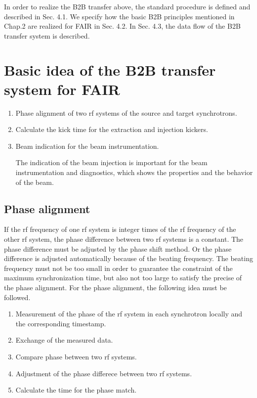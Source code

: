 

In order to realize the B2B transfer above, the standard procedure is defined and described in Sec. 4.1. We specify how the basic B2B principles mentioned in Chap.2 are realized for FAIR in Sec. 4.2. In Sec. 4.3, the data flow of the B2B transfer system is described. 

\section{Basic idea of the B2B transfer system for FAIR} 

\begin{enumerate}
\item Phase alignment of two rf systems of the source and target synchrotrons.

\item Calculate the kick time for the extraction and injection kickers.

\item Beam indication for the beam instrumentation.

The indication of the beam injection is important for the beam instrumentation and diagnostics, which shows the properties and the behavior of the beam. 
\end{enumerate}

\subsection{Phase alignment}
If the rf frequency of one rf system is integer times of the rf frequency of the other rf system, the phase difference between two rf systems is a constant. The phase difference must be adjusted by the phase shift method. Or the phase difference is adjusted automatically because of the beating frequency. The beating frequency must not be too small in order to guarantee the constraint of the maximum synchronization time, but also not too large to satisfy the precise of the phase alignment. For the phase alignment, the following idea must be followed. 
\begin{enumerate}
\item Measurement of the phase of the rf system in each synchrotron locally and the corresponding timestamp.
\item Exchange of the measured data.
\item Compare phase between two rf systems.
\item Adjustment of the phase differece between two rf systems. 
\item Calculate the time for the phase match.
\end{enumerate}
